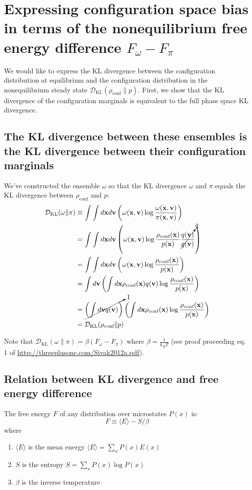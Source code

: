 \documentclass[11pt]{article}
\newcommand{\x}{\mathbf{x}}
\newcommand{\vel}{\mathbf{v}}
\newcommand{\kldiv}{\mathcal{D}_\text{KL}}
\newcommand{\conf}{\rho_\text{conf}}
\begin{document}
\section{Expressing configuration space bias in terms of the nonequilibrium free energy difference $F_\omega - F_\pi$}
We would like to express the KL divergence between the configuration distribution at equilibrium and the configuration distribution in the nonequilibrium steady state $\kldiv(\conf \| p)$.
First, we show that the KL divergence of the configuration marginals is equivalent to the full phase space KL divergence.

\subsection{The KL divergence between these ensembles is the KL divergence between their configuration marginals}
We've constructed the ensemble $\omega$ so that the KL divergence $\omega$ and $\pi$ equals the KL divergence between $\conf$ and $p$:
$$\begin{aligned}
\kldiv(\omega \| \pi) &\equiv \int \int d \x d\vel \left( \omega(\x, \vel) \log \frac{\omega(\x, \vel)}{\pi(\x, \vel)} \right)\\
&= \int \int d \x d\vel \left( \omega(\x, \vel) \log \frac{\conf (\x)}{p(\x)}  \cancelto{1}{\frac{q(\vel)}{q(\vel)}}\right)\\
&= \int \int d \x d\vel \left( \omega(\x, \vel) \log \frac{\conf (\x)}{p(\x)}  \right)\\
&= \int d \vel \left( \int d \x \conf (\x) q(\vel) \log \frac{\conf (\x)}{p(\x)} \right) \\
&= \cancelto{1}{\left( \int d \vel q(\vel) \right)} \left( \int d \x \conf (\x) \log \frac{\conf (\x)}{p(\x)} \right) \\
&= \kldiv(\conf \| p)
\end{aligned}
$$


Note that $\kldiv(\omega \| \pi) = \beta (F_\omega - F_\pi)$ where $\beta = \frac{1}{k_B T}$ (see proof proceeding eq. 1 of \url{http://threeplusone.com/Sivak2012a.pdf}).

\subsection{Relation between KL divergence and  free energy difference}
The free energy $F$ of any distribution over microstates $P(x)$ is:
$$ F \equiv \langle E \rangle - S / \beta$$
where
\begin{enumerate}
\item $\langle E \rangle$ is the mean energy $\langle E \rangle = \sum_x P(x) E(x)$
\item $S$ is the entropy $S = \sum_x P(x) \log P(x)$
\item $\beta$ is the inverse temperature
\end{enumerate}
\end{document}
